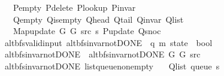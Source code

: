 \begin{isabellebody}
\ \ \ \ P{\isacharunderscore}{\kern0pt}empty\ P{\isacharunderscore}{\kern0pt}delete\ P{\isacharunderscore}{\kern0pt}lookup\ P{\isacharunderscore}{\kern0pt}invar\isanewline
\ \ \ \ Q{\isacharunderscore}{\kern0pt}empty\ Q{\isacharunderscore}{\kern0pt}is{\isacharunderscore}{\kern0pt}empty\ Q{\isacharunderscore}{\kern0pt}head\ Q{\isacharunderscore}{\kern0pt}tail\ Q{\isacharunderscore}{\kern0pt}invar\ Q{\isacharunderscore}{\kern0pt}list\isanewline
\ \ \ \ Map{\isacharunderscore}{\kern0pt}update\ G{}\ G{}\ src\ s\ P{\isacharunderscore}{\kern0pt}update\ Q{\isacharunderscore}{\kern0pt}snoc{\isachardoublequoteclose}\isanewline
\isanewline
{}\isamarkupfalse%
\ {\isacharparenleft}{\kern0pt}\ alt{\isacharunderscore}{\kern0pt}bfs{\isacharunderscore}{\kern0pt}valid{\isacharunderscore}{\kern0pt}input{\isacharparenright}{\kern0pt}\ alt{\isacharunderscore}{\kern0pt}bfs{\isacharunderscore}{\kern0pt}invar{\isacharunderscore}{\kern0pt}not{\isacharunderscore}{\kern0pt}DONE{\isacharprime}{\kern0pt}{\isacharprime}{\kern0pt}\ {\isacharcolon}{\kern0pt}{\isacharcolon}{\kern0pt}\ {\isachardoublequoteopen}{\isacharparenleft}{\kern0pt}{\isacharprime}{\kern0pt}q{\isacharcomma}{\kern0pt}\ {\isacharprime}{\kern0pt}m{\isacharparenright}{\kern0pt}\ state\ {\isasymRightarrow}\ bool{\isachardoublequoteclose}\ \isanewline
\ \ {\isachardoublequoteopen}alt{\isacharunderscore}{\kern0pt}bfs{\isacharunderscore}{\kern0pt}invar{\isacharunderscore}{\kern0pt}not{\isacharunderscore}{\kern0pt}DONE{\isacharprime}{\kern0pt}{\isacharprime}{\kern0pt}\ {\isasymequiv}\ alt{\isacharunderscore}{\kern0pt}bfs{\isacharunderscore}{\kern0pt}invar{\isacharunderscore}{\kern0pt}not{\isacharunderscore}{\kern0pt}DONE{\isacharprime}{\kern0pt}\ G{}\ G{}\ src{\isachardoublequoteclose}\isanewline
\isanewline
{}\isamarkupfalse%
\ {\isacharparenleft}{\kern0pt}\ alt{\isacharunderscore}{\kern0pt}bfs{\isacharunderscore}{\kern0pt}invar{\isacharunderscore}{\kern0pt}not{\isacharunderscore}{\kern0pt}DONE{\isacharparenright}{\kern0pt}\ list{\isacharunderscore}{\kern0pt}queue{\isacharunderscore}{\kern0pt}non{\isacharunderscore}{\kern0pt}empty{\isacharcolon}{\kern0pt}\isanewline
\ \ \ {\isachardoublequoteopen}Q{\isacharunderscore}{\kern0pt}list\ {\isacharparenleft}{\kern0pt}queue\ s{\isacharparenright}{\kern0pt}\ {\isasymnoteq}\ {\isacharbrackleft}{\kern0pt}{\isacharbrackright}{\kern0pt}{\isachardoublequoteclose}%
\endisataginvisible
{\isafoldinvisible}%
%
\isadeliminvisible
\isanewline

\end{isabellebody}
